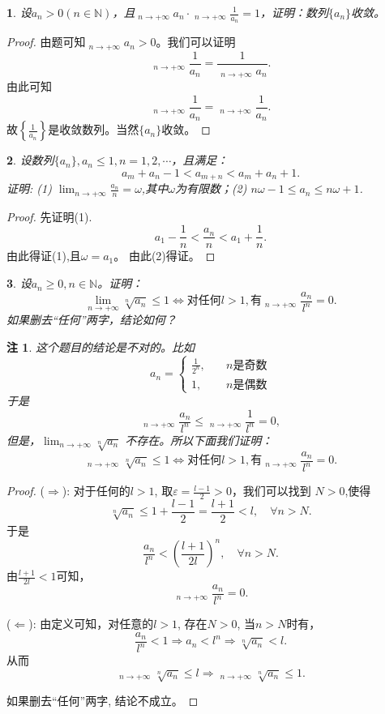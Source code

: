 \documentclass[utf8]{book}
\newtheorem{example}{}[section]             %
\newtheorem{remark}{注}
\DeclareMathOperator*\lowlim{\underline{lim}}
\DeclareMathOperator*\uplim{\overline{lim}}
\begin{document}
\begin{example}
设$a_n>0(n\in\mathbb{N})$，且$\displaystyle\uplim_{n\to +\infty}a_n\cdot\displaystyle\uplim_{n\to +\infty}\frac{1}{a_n}=1$，证明：数列$\{a_n\}$收敛。
\end{example}
\begin{proof}
由题可知$\displaystyle\uplim_{n\to +\infty}a_n > 0$。我们可以证明
$$\displaystyle\lowlim_{n\to +\infty}\frac{1}{a_n} = \frac{1}{\displaystyle\uplim_{n\to +\infty}a_n}.$$
由此可知$$\displaystyle\lowlim_{n\to +\infty}\frac{1}{a_n} = \displaystyle\uplim_{n\to +\infty}\frac{1}{a_n}.$$
故$\left\{\frac{1}{a_n}\right\}$是收敛数列。当然$\{a_n\}$收敛。
\end{proof}
\begin{example}
设数列$\{a_n\}, a_n\leq 1,n=1,2,\cdots$，且满足：
$$a_m+a_n-1<a_{m+n}<a_m+a_n+1.$$
证明: (1) $\displaystyle\lim_{n\to +\infty}\frac{a_n}{n}=\omega$,其中$\omega$为有限数；(2) $n\omega -1 \leq a_n \leq n\omega+1$.
\end{example}
\begin{proof}
先证明(1).
$$a_1 -\frac{1}{n}< \frac{a_n}{n} < a_1 +\frac{1}{n}.$$
由此得证(1),且$\omega=a_1$。
由此(2)得证。
\end{proof}
\begin{example}
设$a_n\geq 0,n\in\mathbb{N}$。证明：
$$\displaystyle\lim_{n\to +\infty}\sqrt[n]{a_n}\leq 1 \iff \text{对任何}l > 1,\text{有} \displaystyle\uplim_{n\to +\infty}\frac{a_n}{l^n} = 0.$$
如果删去“任何”两字，结论如何？
\end{example}
\begin{remark}
这个题目的结论是不对的。比如
\begin{equation*}
a_n  = \begin{cases} \frac{1}{2^n}, &\quad n\text{是奇数}\\
1, &\quad n\text{是偶数}
\end{cases}
\end{equation*}
于是
$$\displaystyle\uplim_{n\to +\infty}\frac{a_n}{l^n} \leq \displaystyle\uplim_{n\to +\infty}\frac{1}{l^n}  = 0,$$
但是，$\displaystyle\lim_{n\to +\infty}\sqrt[n]{a_n}$ 不存在。所以下面我们证明：
$$\displaystyle\uplim_{n\to +\infty}\sqrt[n]{a_n}\leq 1 \iff \text{对任何}l > 1,\text{有} \displaystyle\uplim_{n\to +\infty}\frac{a_n}{l^n} = 0.$$
\end{remark}
\begin{proof}
($\Rightarrow$): 对于任何的$l > 1$, 取$\varepsilon=\frac{l-1}{2} > 0$，我们可以找到
$N>0$,使得$$\sqrt[n]{a_n} \leq 1 + \frac{l -1}{2} = \frac{l + 1}{2} < l,\quad\forall n > N.$$ 
于是 $$\frac{a_n}{l^n} < \left(\frac{l + 1}{2l}\right)^n, \quad\forall n > N.$$
由$\frac{l + 1}{2l} < 1$可知，$$\displaystyle\uplim_{n\to +\infty}\frac{a_n}{l^n} = 0.$$

($\Leftarrow$): 由定义可知，对任意的$l > 1$, 存在$N > 0$, 当$n>N$时有，
$$\frac{a_n}{l^n} < 1 \Rightarrow a_n < l^n\Rightarrow \sqrt[n]{a_n} < l.$$
从而$$\displaystyle\uplim_{n\to +\infty}\sqrt[n]{a_n} \leq l\Rightarrow \displaystyle\uplim_{n\to +\infty}\sqrt[n]{a_n} \leq 1.$$

如果删去“任何”两字, 结论不成立。
\end{proof}
\end{document}
